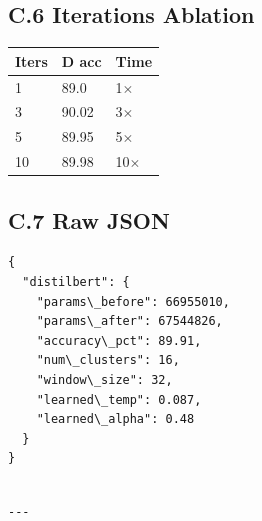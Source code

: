 \subsection{C.6 Iterations Ablation}

\begin{table}[H]
\centering
\small
\begin{tabular}{lll}
\toprule
\textbf{Iters} & \textbf{D acc} & \textbf{Time} \\
\midrule
1 & 89.0 & 1$\times$ \\
3 & 90.02 & 3$\times$ \\
5 & 89.95 & 5$\times$ \\
10 & 89.98 & 10$\times$ \\
\bottomrule
\end{tabular}
\end{table}

\subsection{C.7 Raw JSON}

\begin{lstlisting}
{
  "distilbert": {
    "params\_before": 66955010,
    "params\_after": 67544826,
    "accuracy\_pct": 89.91,
    "num\_clusters": 16,
    "window\_size": 32,
    "learned\_temp": 0.087,
    "learned\_alpha": 0.48
  }
}
\end{lstlisting}
\begin{lstlisting}

---
\end{lstlisting}